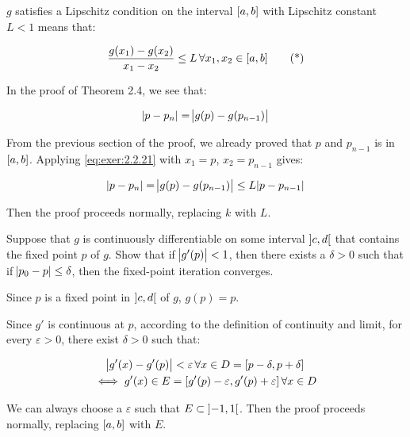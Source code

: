 \documentclass[../../../../Assignments]{subfiles}
\begin{document}
\begin{solution}
    \(g\) satisfies a Lipschitz condition on the interval \(\interval{a}{b}\)
    with Lipschitz constant \(L < 1\) means that:

    \[\frac{g(x_1) - g(x_2)}{x_1 - x_2} \leq L \, \forall x_1, x_2 \in \interval{a}{b} \tag{*}\label{eq:exer:2.2.21}\]

    In the proof of Theorem 2.4, we see that:

    \[\abs{p - p_n} = \abs{g(p) - g(p_{n - 1})}\]

    From the previous section of the proof, we already proved that \(p\) and
    \(p_{n - 1}\) is in \(\interval{a}{b}\). Applying \eqref{eq:exer:2.2.21}
    with \(x_1 = p\), \(x_2 = p_{n - 1}\) gives:

    \[\abs{p - p_n} = \abs{g(p) - g(p_{n - 1})} \leq L \abs{p - p_{n - 1}}\]

    Then the proof proceeds normally, replacing \(k\) with \(L\).
\end{solution}

\begin{exercise}
    Suppose that \(g\) is continuously differentiable on some interval
    \(\interval[open]{c}{d}\) that contains the fixed point \(p\) of \(g\). Show
    that if \(\abs{g'(p)} < 1\), then there exists a \(\delta > 0\) such that if
    \(\abs{p_0 - p} \leq \delta\), then the fixed-point iteration converges.
\end{exercise}

\begin{solution}\label{exer:2.2.22}
    Since \(p\) is a fixed point in \(\interval[open]{c}{d}\) of \(g\),
    \(g(p) = p\).

    Since \(g'\) is continuous at \(p\), according to the definition of
    continuity and limit, for every \(\varepsilon > 0\), there exist \(\delta >
    0\) such that:

    \begin{gather*}
        \abs{g'(x) - g'(p)} < \varepsilon \, \forall x \in D = \interval{p - \delta}{p + \delta} \\
        \iff g'(x) \in E = \interval{g'(p) - \varepsilon}{g'(p) + \varepsilon} \, \forall x \in D
    \end{gather*}

    We can always choose a \(\varepsilon\) such that \(E \subset
    \interval[open]{-1}{1}\). Then the proof proceeds normally, replacing
    \(\interval{a}{b}\) with \(E\).
\end{solution}
\end{document}

